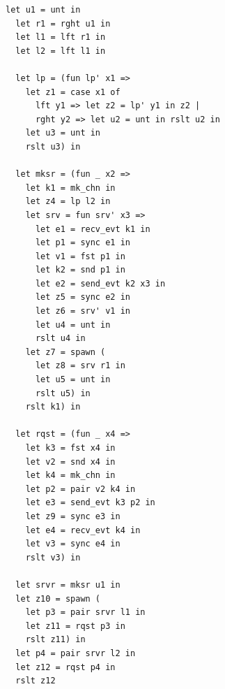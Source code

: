\documentclass{article}
\begin{document}
\begin{lstlisting}[language=normal_lang, escapechar=\%]
  let u1 = unt in
  let r1 = rght u1 in
  let l1 = lft r1 in
  let l2 = lft l1 in

  let lp = (fun lp' x1 => 
    let z1 = case x1 of 
      lft y1 => let z2 = lp' y1 in z2 |
      rght y2 => let u2 = unt in rslt u2 in
    let u3 = unt in
    rslt u3) in

  let mksr = (fun _ x2 => 
    let k1 = mk_chn in
    let z4 = lp l2 in
    let srv = fun srv' x3 =>
      let e1 = recv_evt k1 in
      let p1 = sync e1 in
      let v1 = fst p1 in
      let k2 = snd p1 in 
      let e2 = send_evt k2 x3 in
      let z5 = sync e2 in
      let z6 = srv' v1 in
      let u4 = unt in
      rslt u4 in
    let z7 = spawn (
      let z8 = srv r1 in
      let u5 = unt in
      rslt u5) in
    rslt k1) in

  let rqst = (fun _ x4 =>
    let k3 = fst x4 in
    let v2 = snd x4 in
    let k4 = mk_chn in
    let p2 = pair v2 k4 in
    let e3 = send_evt k3 p2 in
    let z9 = sync e3 in
    let e4 = recv_evt k4 in
    let v3 = sync e4 in
    rslt v3) in

  let srvr = mksr u1 in
  let z10 = spawn ( 
    let p3 = pair srvr l1 in
    let z11 = rqst p3 in
    rslt z11) in
  let p4 = pair srvr l2 in
  let z12 = rqst p4 in
  rslt z12
  \end{lstlisting}
\end{document}
